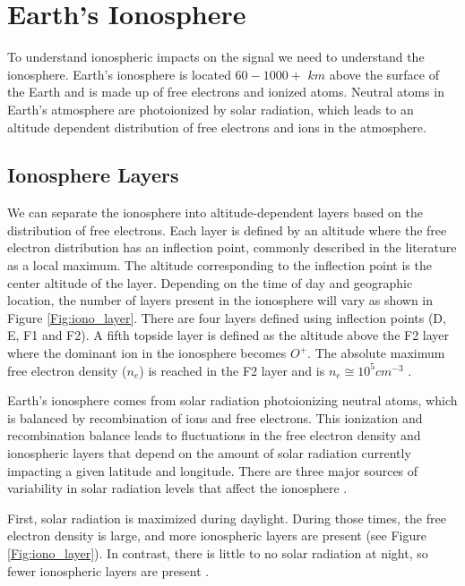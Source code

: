 \section{Earth's Ionosphere}

To understand ionospheric impacts on the \cm signal we need to understand the ionosphere. Earth's ionosphere is located $60 - 1000+$ $km$ above the surface of the Earth and is made up of free electrons and ionized atoms. Neutral atoms in Earth's atmosphere are photoionized by solar radiation, which leads to an altitude dependent distribution of free electrons and ions in the atmosphere.


\subsection{Ionosphere Layers}

We can separate the ionosphere into altitude-dependent layers based on the distribution of free electrons. Each layer is defined by an altitude where the free electron distribution has an inflection point, commonly described in the literature as a local maximum. The altitude corresponding to the inflection point is the center altitude of the layer. Depending on the time of day and geographic location, the number of layers present in the ionosphere will vary as shown in Figure \ref{Fig:iono_layer}. There are four layers defined using inflection points (D, E, F1 and F2). A fifth topside layer is defined as the altitude above the F2 layer where the dominant ion in the ionosphere becomes $O^+$. The absolute maximum free electron density ($n_e$) is reached in the F2 layer and is $n_e \cong 10^5 cm^{-3}$ \cite{ionospheres}. 

Earth's ionosphere comes from solar radiation photoionizing neutral atoms, which is balanced by recombination of ions and free electrons. This ionization and recombination balance leads to fluctuations in the free electron density and ionospheric layers that depend on the amount of solar radiation currently impacting a given latitude and longitude. There are three major sources of variability in solar radiation levels that affect the ionosphere \cite{ionospheres}.

First, solar radiation is maximized during daylight. During those times, the free electron density is large, and more ionospheric layers are present (see Figure \ref{Fig:iono_layer}). In contrast, there is little to no solar radiation at night, so fewer ionospheric layers are present \cite{ionospheres}. 

